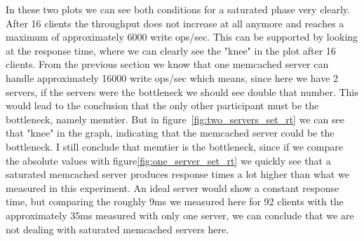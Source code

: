 \documentclass[11pt,a4paper]{article}
\begin{document}
%
In these two plots we can see both conditions for a saturated phase very clearly.
%
After 16 clients the throughput does not increase at all anymore and reaches a maximum of approximately 6000 write ops/sec.
%
This can be supported by looking at the response time, where we can clearly see the "knee" in the plot after 16 clients.
%
From the previous section we know that one memcached server can handle approximately 16000 write ops/sec which means, since here we have 2 servers, if the servers were the bottleneck we should see double that number.
%
This would lead to the conclusion that the only other participant must be the bottleneck, namely memtier.
%
But in figure~\ref{fig:two_servers_set_rt} we can see that "knee" in the graph, indicating that the memcached server could be the bottleneck.
%
I still conclude that memtier is the bottleneck, since if we compare the absolute values with figure\ref{fig:one_server_set_rt} we quickly see that a saturated memcached server produces response times a lot higher than what we measured in this experiment.
%
An ideal server would show a constant response time, but comparing the roughly 9ms we measured here for 92 clients with the approximately 35ms measured with only one server, we can conclude that we are not dealing with saturated memcached servers here.
%
\end{document}
